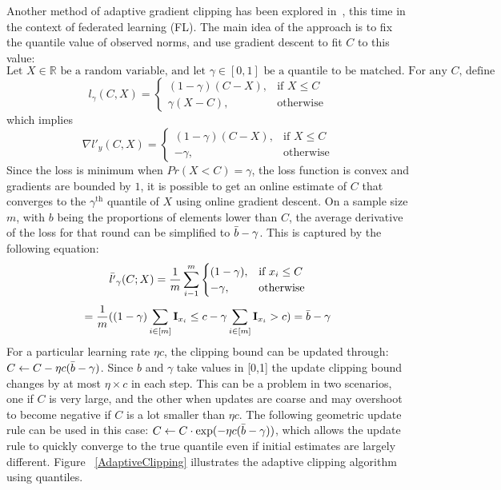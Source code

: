 Another method of adaptive gradient clipping has been explored in~\cite{RefWorks:RefID:37-andrewdifferentially}, this time in the context of federated learning (FL). %
The main idea of the approach is to fix the quantile value of observed norms, and use gradient descent to fit $C$ to this value:
\[ \text{Let $X \in \mathbb{R}$ be a random variable, and let $\gamma \in [0,1]$ be a quantile to be matched. For any $C$, define}\] 
\[ l_\gamma (C,X)= 
\begin{cases}
    (1-\gamma)(C-X),& \text{if } X\leq C\\
    \gamma(X-C),              & \text{otherwise}
\end{cases}\]
which implies
\[
\nabla l'_y(C,X)=
\begin{cases}
    (1-\gamma)(C-X),& \text{if } X\leq C\\
    -\gamma,              & \text{otherwise}
\end{cases}
\] 
Since the loss is minimum when $Pr(X<C)=\gamma$, the loss function is convex and gradients are bounded by $1$, it is possible to get an online estimate of $C$ that converges to the $\gamma^\text{th}$ quantile of $X$ using online gradient descent. On a sample size $m$, with $b$ being the proportions of elements lower than $C$, the average derivative of the loss for that round can be simplified to $\Bar{b}-\gamma$. This is captured by the following equation:
\[ \Bar{l'}_\gamma (C;X)= \frac{1}{m}\sum_{i-1}^m
\begin{cases}
    (1-\gamma),& \text{if } x_i\leq C\\
    -\gamma,              & \text{otherwise}
\end{cases}\]
\[ =\frac{1}{m}((1-\gamma)\sum_{i\in [m]} \mathbf{I}_{x_i}\leq c-\gamma \sum_{i\in [m]} \mathbf{I}_{x_i}>c)=\Bar{b}-\gamma\] 
For a particular learning rate $\eta c$, the clipping bound can be updated through: $C\leftarrow C-\eta c(\Bar{b}-\gamma)$. Since $b$ and $\gamma$ take values in [0,1] the update clipping bound changes by at most $\eta \times c$ in each step. This can be a problem in two scenarios, one if $C$ is very large, and the other when updates are coarse and may overshoot to become negative if $C$ is a lot smaller than $\eta c$. The following geometric update rule can be used in this case: $C\leftarrow C \cdot \text{exp}(-\eta c(\Bar{b}-\gamma))$, which allows the update rule to quickly converge to the true quantile even if initial estimates are largely different. Figure ~\ref{AdaptiveClipping} illustrates the adaptive clipping algorithm using quantiles.

